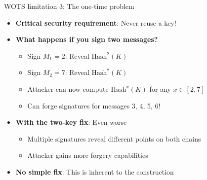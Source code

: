 \documentclass[aspectratio=169, lualatex, handout]{beamer}
\begin{document}
\begin{frame}{WOTS limitation 3: The one-time problem}
	\begin{itemize}
		\item \textbf{Critical security requirement}: Never reuse a key!
		\item \textbf{What happens if you sign two messages?}
		      \begin{itemize}
			      \item Sign $M_1 = 2$: Reveal $\text{Hash}^2(K)$
			      \item Sign $M_2 = 7$: Reveal $\text{Hash}^7(K)$
			      \item Attacker can now compute $\text{Hash}^x(K)$ for any $x \in [2,7]$
			      \item Can forge signatures for messages 3, 4, 5, 6!
		      \end{itemize}
		\item \textbf{With the two-key fix}: Even worse
		      \begin{itemize}
			      \item Multiple signatures reveal different points on both chains
			      \item Attacker gains more forgery capabilities
		      \end{itemize}
		\item \textbf{No simple fix}: This is inherent to the construction
	\end{itemize}
\end{frame}
\end{document}
